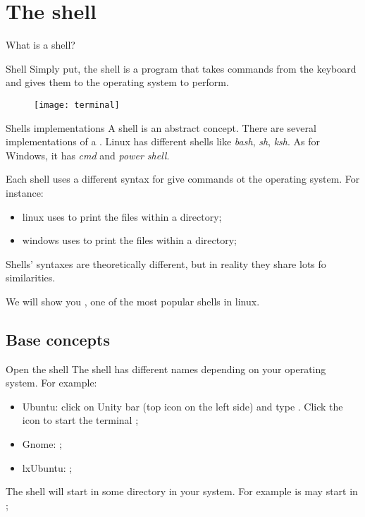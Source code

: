 \section{The shell}

\begin{frame}{What is a shell?}

\begin{block}{Shell}
Simply put, the shell is a program that takes commands from the keyboard and gives them to the operating system to perform\cite{whatIsTheShell}.
\end{block}

\begin{figure}
	\centering
	\texttt{[image: terminal]}
\end{figure}

\end{frame}

\begin{frame}{Shells implementations}
	A shell is an abstract concept. There are several implementations of a . Linux has different shells like \textit{bash}, \textit{sh}, \textit{ksh}. As for Windows, it has \textit{cmd} and \textit{power shell}.
	
	Each shell uses a different syntax for give commands ot the operating system. For instance:
	\begin{itemize}
		\item linux uses  to print the files within a directory;
		\item windows uses  to print the files within a directory;
	\end{itemize}
	
	Shells' syntaxes are theoretically different, but in reality they share lots fo similarities.
	
	\begin{note}
		We will show you , one of the most popular shells in linux.
	\end{note}
\end{frame}

\subsection{Base concepts}

\begin{frame}{Open the shell}
	The shell has different names depending on your operating system. For example:
	\begin{itemize}
		\item Ubuntu: click on Unity bar (top icon on the left side) and type . Click the icon to start the terminal \cite{ubuntu:openterminal};
		\item Gnome: ;
		\item lxUbuntu: ;
	\end{itemize}
	
	The shell will start in some directory in your system. For example is may start in ;
\end{frame}

